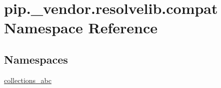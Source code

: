 \hypertarget{namespacepip_1_1__vendor_1_1resolvelib_1_1compat}{}\section{pip.\+\_\+vendor.\+resolvelib.\+compat Namespace Reference}
\label{namespacepip_1_1__vendor_1_1resolvelib_1_1compat}
\subsection*{Namespaces}
\begin{DoxyCompactItemize}
\item 
 \hyperlink{namespacepip_1_1__vendor_1_1resolvelib_1_1compat_1_1collections__abc}{collections\+\_\+abc}
\end{DoxyCompactItemize}
